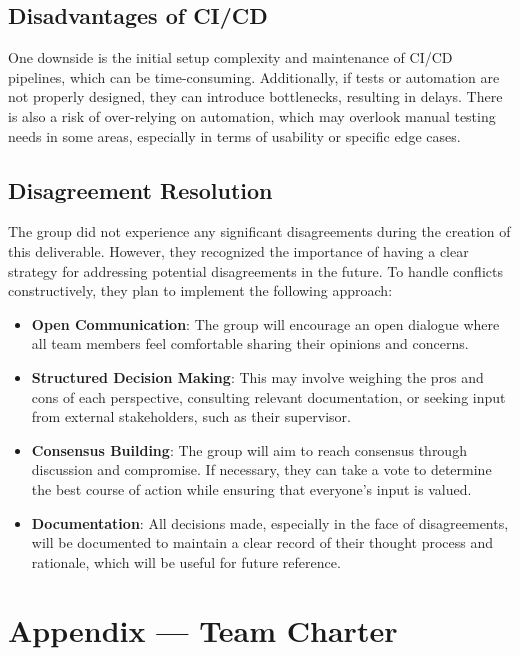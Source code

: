 \documentclass{article}
\begin{document}
\subsection*{Disadvantages of CI/CD}
One downside is the initial setup complexity and maintenance of CI/CD pipelines, which can be time-consuming. Additionally, if tests or automation are not properly designed, they can introduce bottlenecks, resulting in delays. There is also a risk of over-relying on automation, which may overlook manual testing needs in some areas, especially in terms of usability or specific edge cases.

\subsection*{Disagreement Resolution}
The group did not experience any significant disagreements during the creation of this deliverable. However, they recognized the importance of having a clear strategy for addressing potential disagreements in the future. To handle conflicts constructively, they plan to implement the following approach:

\begin{itemize}
    \item \textbf{Open Communication}: The group will encourage an open dialogue where all team members feel comfortable sharing their opinions and concerns.
    \item \textbf{Structured Decision Making}: This may involve weighing the pros and cons of each perspective, consulting relevant documentation, or seeking input from external stakeholders, such as their supervisor.
    \item \textbf{Consensus Building}: The group will aim to reach consensus through discussion and compromise. If necessary, they can take a vote to determine the best course of action while ensuring that everyone’s input is valued.
    \item \textbf{Documentation}: All decisions made, especially in the face of disagreements, will be documented to maintain a clear record of their thought process and rationale, which will be useful for future reference.
\end{itemize}

\newpage{}

\section*{Appendix --- Team Charter}
\end{document}
